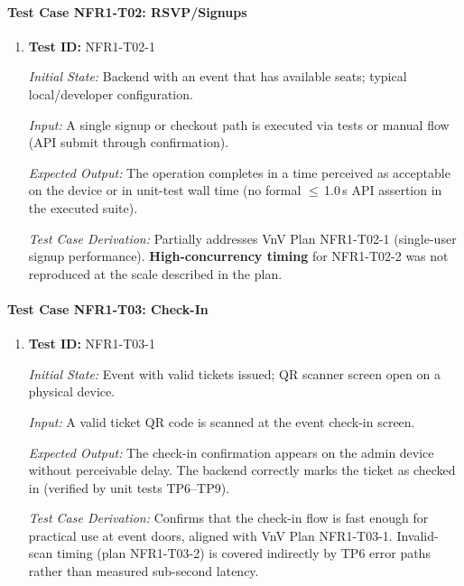 \documentclass[12pt, titlepage]{article}
\begin{document}
\paragraph{Test Case NFR1-T02: RSVP/Signups}

\begin{enumerate}

\item \textbf{Test ID:} NFR1-T02-1

\textit{Initial State:} Backend with an event that has available seats; typical local/developer configuration.

\textit{Input:} A single signup or checkout path is executed via tests or manual flow (API submit through confirmation).

\textit{Expected Output:} The operation completes in a time perceived as acceptable on the device or in unit-test wall time (no formal $\leq$\,1.0\,s API assertion in the executed suite).

\textit{Test Case Derivation:} Partially addresses VnV Plan NFR1-T02-1 (single-user signup performance). \textbf{High-concurrency timing} for NFR1-T02-2 was not reproduced at the scale described in the plan.

\end{enumerate}


\paragraph{Test Case NFR1-T03: Check-In}

\begin{enumerate}

\item \textbf{Test ID:} NFR1-T03-1

\textit{Initial State:} Event with valid tickets issued; QR scanner screen open on a physical device.

\textit{Input:} A valid ticket QR code is scanned at the event check-in screen.

\textit{Expected Output:} The check-in confirmation appears on the admin device without perceivable delay. The backend correctly marks the ticket as checked in (verified by unit tests TP6--TP9).

\textit{Test Case Derivation:} Confirms that the check-in flow is fast enough for practical use at event doors, aligned with VnV Plan NFR1-T03-1. Invalid-scan timing (plan NFR1-T03-2) is covered indirectly by TP6 error paths rather than measured sub-second latency.

\end{enumerate}
\end{document}
